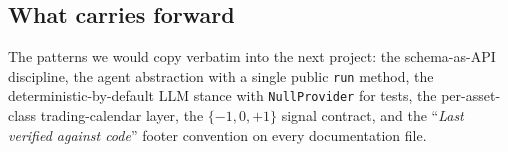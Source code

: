 \subsection{What carries forward}

The patterns we would copy verbatim into the next project: the
schema-as-API discipline, the agent abstraction with a single public
\texttt{run} method, the deterministic-by-default LLM stance with
\texttt{NullProvider} for tests, the per-asset-class trading-calendar layer, the
$\{-1, 0, +1\}$ signal contract, and the ``\emph{Last verified against code}''
footer convention on every documentation file.
